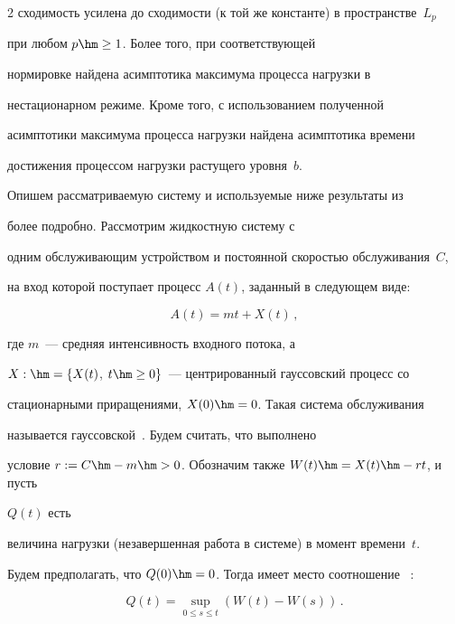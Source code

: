 \begin{multicols}{2}
сходимость усилена до сходимости (к той же константе) в пространстве~$L_p$ 


при любом  $p\hm\ge 1$. Более того, при соответствующей


нормировке найдена асимптотика максимума процесса нагрузки в


нестационарном режиме. Кроме того, с использованием полученной


асимптотики максимума процесса нагрузки найдена асимптотика  времени


достижения процессом нагрузки растущего уровня~$b$.





Опишем рассматриваемую систему и используемые ниже результаты из~\cite{Lukashenko} 


более подробно.  Рассмотрим жидкостную систему с


одним обслуживающим устройством и постоянной скоростью обслуживания~$C$, 


на вход которой поступает процесс $A(t)$, заданный  в следующем виде:


\begin{equation}


A(t)=mt+X(t)\,, 


\label{asymp-l1}


\end{equation}


где  $m$~--- средняя интенсивность входного потока, а


$X:\hm=\{X(t)$, $t \hm\geq 0\}$~---  центрированный гауссовский процесс со


стационарными приращениями,  $X(0)\hm=0$. Такая система обслуживания


называется гауссовской~\cite{Mandjes}.  Будем считать, что выполнено


условие $r:=C\hm-m\hm>0$. Обозначим также $W(t)\hm=X(t)\hm-rt$, и пусть


 $Q(t)$  есть


величина нагрузки (незавершенная работа в системе) в момент времени~$t$. 


Будем предполагать, что  $Q(0)\hm=0$. Тогда имеет место соотношение~ \cite{Reich}:


\begin{equation}


Q(t)=\sup\limits_{0 \leq s \leq t}(W(t)-W(s))\,.\label{6a}


\end{equation}



\end{multicols}
